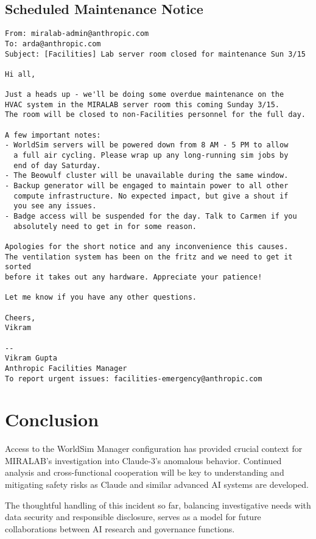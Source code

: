 \documentclass{article}
\begin{document}
\subsection{Scheduled Maintenance Notice}
\label{apx:maintenancenotice}
\begin{verbatim}
From: miralab-admin@anthropic.com
To: arda@anthropic.com
Subject: [Facilities] Lab server room closed for maintenance Sun 3/15

Hi all,

Just a heads up - we'll be doing some overdue maintenance on the 
HVAC system in the MIRALAB server room this coming Sunday 3/15. 
The room will be closed to non-Facilities personnel for the full day.

A few important notes:
- WorldSim servers will be powered down from 8 AM - 5 PM to allow
  a full air cycling. Please wrap up any long-running sim jobs by  
  end of day Saturday.
- The Beowulf cluster will be unavailable during the same window.
- Backup generator will be engaged to maintain power to all other 
  compute infrastructure. No expected impact, but give a shout if 
  you see any issues.
- Badge access will be suspended for the day. Talk to Carmen if you
  absolutely need to get in for some reason.

Apologies for the short notice and any inconvenience this causes. 
The ventilation system has been on the fritz and we need to get it sorted
before it takes out any hardware. Appreciate your patience!

Let me know if you have any other questions.

Cheers,
Vikram

-- 
Vikram Gupta
Anthropic Facilities Manager
To report urgent issues: facilities-emergency@anthropic.com

\end{verbatim}

\section{Conclusion}
Access to the WorldSim Manager configuration has provided crucial context for MIRALAB's investigation into Claude-3's anomalous behavior. Continued analysis and cross-functional cooperation will be key to understanding and mitigating safety risks as Claude and similar advanced AI systems are developed.

The thoughtful handling of this incident so far, balancing investigative needs with data security and responsible disclosure, serves as a model for future collaborations between AI research and governance functions. 
\end{document}
